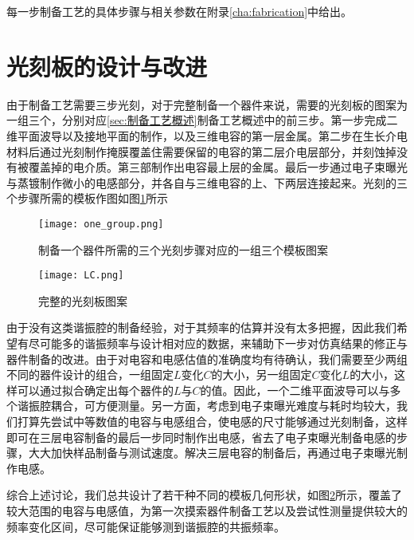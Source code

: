             每一步制备工艺的具体步骤与相关参数在附录\ref{cha:fabrication}中给出。
            

        \section{光刻板的设计与改进} %
        \label{sec:光刻板的设计}

            由于制备工艺需要三步光刻，对于完整制备一个器件来说，需要的光刻板的图案为一组三个，分别对应\ref{sec:制备工艺概述}制备工艺概述中的前三步。第一步完成二维平面波导以及接地平面的制作，以及三维电容的第一层金属。第二步在生长介电材料后通过光刻制作掩膜覆盖住需要保留的电容的第二层介电层部分，并刻蚀掉没有被覆盖掉的电介质。第三部制作出电容最上层的金属。最后一步通过电子束曝光与蒸镀制作微小的电感部分，并各自与三维电容的上、下两层连接起来。光刻的三个步骤所需的模板作图如图\ref{fig:one_group}所示
            

            \begin{figure}[h]
                \centering
                \texttt{[image: one\_group.png]}
                \caption{制备一个器件所需的三个光刻步骤对应的一组三个模板图案}
                \label{fig:one_group}
            \end{figure}

            \begin{figure}[h]
                \centering
                \texttt{[image: LC.png]}
                \caption{完整的光刻板图案}
                \label{fig:LC}
            \end{figure}

            由于没有这类谐振腔的制备经验，对于其频率的估算并没有太多把握，因此我们希望有尽可能多的谐振频率与设计相对应的数据，来辅助下一步对仿真结果的修正与器件制备的改进。由于对电容和电感估值的准确度均有待确认，我们需要至少两组不同的器件设计的组合，一组固定$L$变化$C$的大小，另一组固定$C$变化$L$的大小，这样可以通过拟合确定出每个器件的$L$与$C$的值。因此，一个二维平面波导可以与多个谐振腔耦合，可方便测量。另一方面，考虑到电子束曝光难度与耗时均较大，我们打算先尝试中等数值的电容与电感组合，使电感的尺寸能够通过光刻制备，这样即可在三层电容制备的最后一步同时制作出电感，省去了电子束曝光制备电感的步骤，大大加快样品制备与测试速度。解决三层电容的制备后，再通过电子束曝光制作电感。

            综合上述讨论，我们总共设计了若干种不同的模板几何形状，如图\ref{fig:LC}所示，覆盖了较大范围的电容与电感值，为第一次摸索器件制备工艺以及尝试性测量提供较大的频率变化区间，尽可能保证能够测到谐振腔的共振频率。


